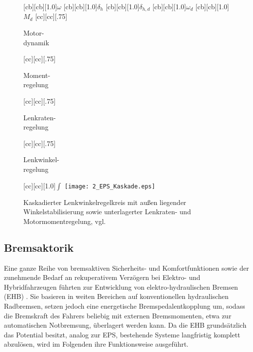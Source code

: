 \begin{figure}[h]
\newcommand{\smallsize}{.75}
	[cb][cb][1.0]{$\omega$}
	[cb][cb][1.0]{$\delta_h$}
	[cb][cb][1.0]{$\delta_{h,d}$}
	[cb][cb][1.0]{$\omega_{d}$}
	[cb][cb][1.0]{$M_d$}
	[cc][cc][\smallsize]{{\parbox[c]{7cm}{\begin{center} Motor- \\ dynamik \end{center}}}}
		[cc][cc][\smallsize]{{\parbox[c]{7cm}{\begin{center} Moment- \\ regelung \end{center}}}}
		[cc][cc][\smallsize]{{\parbox[c]{7cm}{\begin{center} Lenkraten- \\ regelung \end{center}}}}
				[cc][cc][\smallsize]{{\parbox[c]{7cm}{\begin{center} Lenkwinkel- \\ regelung \end{center}}}}
	[cc][cc][1.0]{$\int$}
\centering
\texttt{[image: 2\_EPS\_Kaskade.eps]}
 \caption[Kaskadierter Lenkwinkelregelkreis]{Kaskadierter Lenkwinkelregelkreis mit außen liegender Winkelstabilisierung sowie unterlagerter Lenkraten- und Motormomentregelung, vgl.\ \zB \cite{graf2003neue}}
 \label{fig:eps_kaskade}
\end{figure} 

\subsection{Bremsaktorik}
%
%
Eine ganze Reihe von bremsaktiven Sicherheits- und Komfortfunktionen sowie der zunehmende Bedarf an rekuperativem Verzögern bei Elektro- und Hybridfahrzeugen führten zur Entwicklung von elektro-hydraulischen Bremsen (EHB) \cite{breuer20012bremsenhandbuch}. Sie basieren in weiten Bereichen auf konventionellen hydraulischen Radbremsen, setzen jedoch eine energetische Bremspedalentkopplung um, sodass die Bremskraft des Fahrers beliebig mit externen Bremsmomenten, etwa zur automatischen Notbremsung, überlagert werden kann. Da die EHB grundsätzlich das Potential besitzt, analog zur EPS, bestehende Systeme langfristig komplett abzulösen, wird im Folgenden ihre Funktionsweise ausgeführt.

